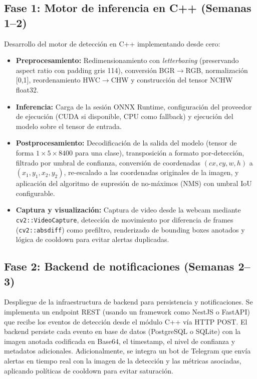 \documentclass[sigconf,nonacm]{acmart}
\begin{document}
\subsection{Fase 1: Motor de inferencia en C++ (Semanas 1--2)}

Desarrollo del motor de detección en C++ implementando desde cero:
\begin{itemize}
\item \textbf{Preprocesamiento:} Redimensionamiento con \textit{letterboxing} (preservando aspect ratio con padding gris 114), conversión BGR$\rightarrow$RGB, normalización [0,1], reordenamiento HWC$\rightarrow$CHW y construcción del tensor NCHW float32.
\item \textbf{Inferencia:} Carga de la sesión ONNX Runtime, configuración del proveedor de ejecución (CUDA si disponible, CPU como fallback) y ejecución del modelo sobre el tensor de entrada.
\item \textbf{Postprocesamiento:} Decodificación de la salida del modelo (tensor de forma $1 \times 5 \times 8400$ para una clase), transposición a formato por-detección, filtrado por umbral de confianza, conversión de coordenadas $(cx,cy,w,h)$ a $(x_1,y_1,x_2,y_2)$, re-escalado a las coordenadas originales de la imagen, y aplicación del algoritmo de supresión de no-máximos (NMS) con umbral IoU configurable.
\item \textbf{Captura y visualización:} Captura de video desde la webcam mediante \texttt{cv2::VideoCapture}, detección de movimiento por diferencia de frames (\texttt{cv2::absdiff}) como prefiltro, renderizado de bounding boxes anotados y lógica de cooldown para evitar alertas duplicadas.
\end{itemize}

\subsection{Fase 2: Backend de notificaciones (Semanas 2--3)}

Despliegue de la infraestructura de backend para persistencia y notificaciones. Se implementa un endpoint REST (usando un framework como NestJS o FastAPI) que recibe los eventos de detección desde el módulo C++ vía HTTP POST. El backend persiste cada evento en base de datos (PostgreSQL o SQLite) con la imagen anotada codificada en Base64, el timestamp, el nivel de confianza y metadatos adicionales. Adicionalmente, se integra un bot de Telegram que envía alertas en tiempo real con la imagen de la detección y las métricas asociadas, aplicando políticas de cooldown para evitar saturación.
\end{document}

